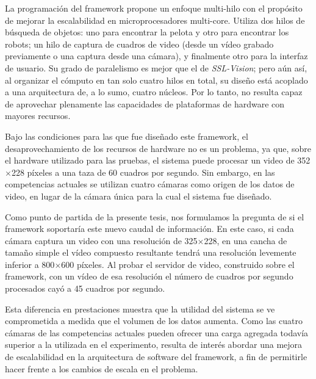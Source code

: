 La programación del framework propone un enfoque multi-hilo con el propósito de
mejorar la escalabilidad en microprocesadores multi-core. Utiliza dos hilos de
búsqueda de objetos: uno para encontrar la pelota y otro para encontrar los
robots; un hilo de captura de cuadros de video (desde un vídeo grabado
previamente o una captura desde una cámara), y finalmente otro para la interfaz
de usuario. Su grado de paralelismo es mejor que el de \emph{SSL-Vision}; pero
aún así, al organizar el cómputo en tan solo cuatro hilos en total, su diseño
está acoplado a una arquitectura de, a lo sumo, cuatro núcleos. Por lo tanto, no
resulta capaz de aprovechar plenamente las capacidades de plataformas de
hardware con mayores recursos.

Bajo las condiciones para las que fue diseñado este framework, el
desaprovechamiento de los recursos de hardware no es un problema, ya que, sobre
el hardware utilizado para las pruebas, el sistema puede procesar un video de
352$\times$228 píxeles a una taza de 60 cuadros por segundo. Sin embargo, en las
competencias actuales se utilizan cuatro cámaras como origen de los datos de
video, en lugar de la cámara única para la cual el sistema fue diseñado.

Como punto de partida de la presente tesis, nos formulamos la pregunta de si el
framework soportaría este nuevo caudal de información. En este caso, si cada
cámara captura un video con una resolución de 325$\times$228, en una cancha de
tamaño simple el vídeo compuesto resultante tendrá una resolución levemente
inferior a 800$\times$600 píxeles.  Al probar el servidor de video, construido
sobre el framework, con un vídeo de esa resolución el número de cuadros por
segundo procesados cayó a 45 cuadros por segundo.

Esta diferencia en prestaciones muestra que la utilidad del sistema se ve
comprometida a medida que el volumen de los datos aumenta. Como las cuatro
cámaras de las competencias actuales pueden ofrecer una carga agregada todavía
superior a la utilizada en el experimento, resulta de interés abordar una mejora
de escalabilidad en la arquitectura de software del framework, a fin de
permitirle hacer frente a los cambios de escala en el problema.
